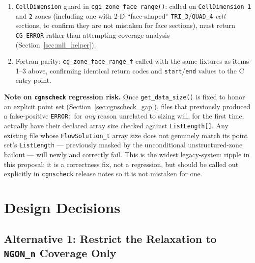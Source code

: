 \documentclass[11pt,letterpaper]{article}
\begin{document}
\begin{enumerate}[leftmargin=2em]
  still be accepted for \texttt{CellDimension~$\geq$~3} (matching
  \texttt{cg\_gridlocation\_write}'s existing behavior) and rejected
  below that, pinning down the delegated-\texttt{cgi\_check\_location}
  behavior in both directions.
\item \texttt{CellDimension} guard in \texttt{cgi\_zone\_face\_range()}:
  called on \texttt{CellDimension~1} and \texttt{2} zones (including one
  with 2-D ``face-shaped'' \texttt{TRI\_3}/\texttt{QUAD\_4} \emph{cell}
  sections, to confirm they are not mistaken for face sections), must
  return \texttt{CG\_ERROR} rather than attempting coverage analysis
  (Section~\ref{sec:mll_helper}).
\item Fortran parity: \texttt{cg\_zone\_face\_range\_f} called with the
  same fixtures as items 1--3 above, confirming identical return codes
  and \texttt{start}/\texttt{end} values to the C entry point.
\end{enumerate}

\textbf{Note on \texttt{cgnscheck} regression risk.} Once
\texttt{get\_data\_size()} is fixed to honor an explicit point set
(Section~\ref{sec:cgnscheck_gap}), files that previously produced a
false-positive \texttt{ERROR:} for \emph{any} reason unrelated to
sizing will, for the first time, actually have their declared array size
checked against \texttt{ListLength[]}. Any existing file whose
\texttt{FlowSolution\_t} array size does not genuinely match its point
set's \texttt{ListLength} --- previously masked by the unconditional
unstructured-zone bailout --- will newly and correctly fail. This is the
widest legacy-system ripple in this proposal: it is a correctness fix,
not a regression, but should be called out explicitly in \texttt{cgnscheck}
release notes so it is not mistaken for one.

\section{Design Decisions}

\subsection{Alternative 1: Restrict the Relaxation to \texttt{NGON\_n} Coverage Only}
\label{sec:alt-ngon-only}
\end{document}
